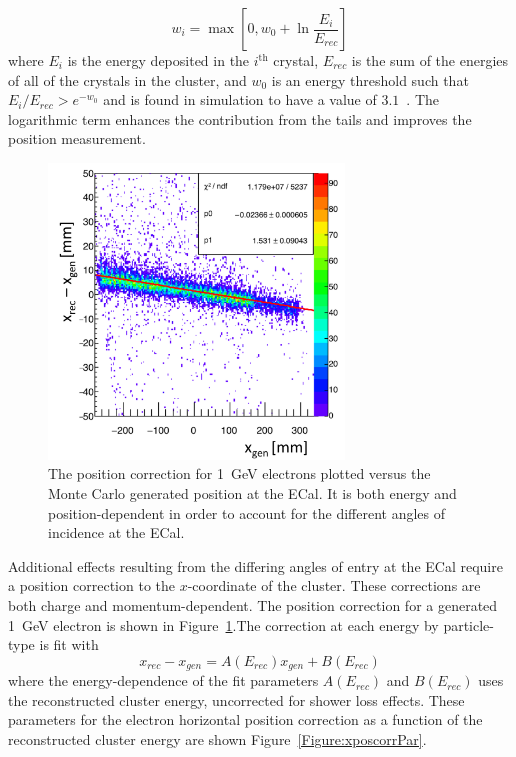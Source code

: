 \begin{equation}
\label{eq:posnwt}
w_i  =  \max[0, w_0+\ln\dfrac{E_i}{E_{rec}}]
\end{equation}
where $E_i$ is the energy deposited in the $i^{\textrm{th}}$ crystal, $E_{rec}$ is the sum of the energies of all of the crystals in the cluster, and $w_0$ is an energy threshold such that $E_i/E_{rec} > e^{-w_0}$ and is found in simulation to have a value of $3.1$~\cite{szumila-vance_hps_ecal_2014}. The logarithmic term enhances the contribution from the tails and improves the position measurement.\\
\begin{figure}[htb]
  \centering
      \includegraphics[width=0.7\textwidth]{pics/performance/xposn1gev.png}
  \caption[Horizontal position correction for 1~GeV electrons]{The position correction for 1~GeV electrons plotted versus the Monte Carlo generated position at the ECal. It is both energy and position-dependent in order to account for the different angles of incidence at the ECal.}
  \label{Figure:xposn1gev}
\end{figure}
\indent Additional effects resulting from the differing angles of entry at the ECal require a position correction to the $x$-coordinate of the cluster. These corrections are both charge and momentum-dependent. The position correction for a generated 1~GeV electron is shown in Figure~\ref{Figure:xposn1gev}.The correction at each energy by particle-type is fit with
\begin{equation}
\label{eq:posncorr}
x_{rec} - x_{gen} = A(E_{rec}) x_{gen} + B(E_{rec})
\end{equation}
where the energy-dependence of the fit parameters $A(E_{rec})$ and $B(E_{rec})$ uses the reconstructed cluster energy, uncorrected for shower loss effects. These parameters for the electron horizontal position correction as a function of the reconstructed cluster energy are shown Figure~\ref{Figure:xposcorrPar}.

